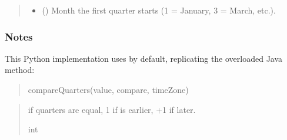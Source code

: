\documentclass[letterpaper,10pt,english]{sphinxmanual}
\begin{document}
\begin{fulllineitems}
\begin{fulllineitems}
\begin{quote}
\begin{description}
\begin{itemize}
\item {} 
\sphinxAtStartPar
{} () \textendash{} Month the first quarter starts (1 = January, 3 = March, etc.).

\end{itemize}

\end{description}\end{quote}
\subsubsection*{Notes}

\sphinxAtStartPar
This Python implementation uses  by default,
replicating the overloaded Java method:
\begin{quote}

\sphinxAtStartPar
compareQuarters(value, compare, timeZone)
\end{quote}
\begin{quote}\begin{description}
 if quarters are equal, \sphinxhyphen{}1 if  is earlier, +1 if later.

\sphinxAtStartPar
int

\end{description}\end{quote}

\end{fulllineitems}



\end{fulllineitems}
\end{document}
